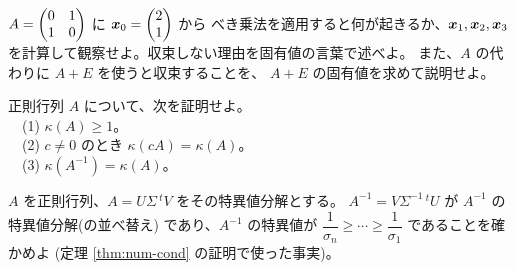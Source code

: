 \begin{mondai}[発展]\label{q:num-ex10}
$A = \begin{pmatrix}0 & 1 \\ 1 & 0\end{pmatrix}$ に $\bm{x}_0 = \begin{pmatrix}2 \\ 1\end{pmatrix}$ から
べき乗法を適用すると何が起きるか、$\bm{x}_1, \bm{x}_2, \bm{x}_3$
を計算して観察せよ。収束しない理由を固有値の言葉で述べよ。
また、$A$ の代わりに $A + E$ を使うと収束することを、
$A + E$ の固有値を求めて説明せよ。
\end{mondai}

\begin{mondai}[証明]\label{q:num-ex11}
正則行列 $A$ について、次を証明せよ。\\
　(1) $\kappa(A) \ge 1$。\\
　(2) $c \neq 0$ のとき $\kappa(cA) = \kappa(A)$。\\
　(3) $\kappa(A^{-1}) = \kappa(A)$。
\end{mondai}

\begin{mondai}[証明]\label{q:num-ex12}
$A$ を正則行列、$A = U\Sigma\,{}^tV$ をその特異値分解とする。
$A^{-1} = V\Sigma^{-1}\,{}^tU$ が $A^{-1}$ の特異値分解(の並べ替え)
であり、$A^{-1}$ の特異値が $\dfrac{1}{\sigma_n} \ge \cdots \ge
\dfrac{1}{\sigma_1}$ であることを確かめよ
(定理 \ref{thm:num-cond} の証明で使った事実)。
\end{mondai}

